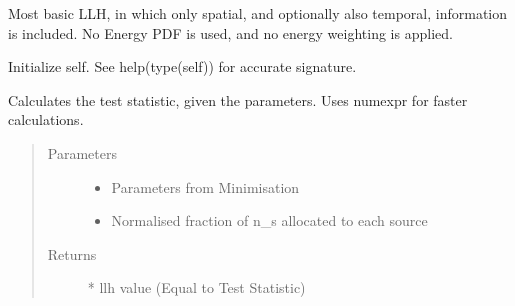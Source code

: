 \documentclass[letterpaper,10pt,english]{sphinxmanual}
\begin{document}
\begin{fulllineitems}
\label{\detokenize{index:flarestack.core.llh.SpatialLLH}}
Most basic LLH, in which only spatial, and optionally also temporal,
information is included. No Energy PDF is used, and no energy weighting
is applied.

\begin{fulllineitems}
\label{\detokenize{index:flarestack.core.llh.SpatialLLH.__init__}}
Initialize self.  See help(type(self)) for accurate signature.

\end{fulllineitems}


\begin{fulllineitems}
\label{\detokenize{index:flarestack.core.llh.SpatialLLH.calculate_test_statistic}}
Calculates the test statistic, given the parameters. Uses numexpr
for faster calculations.
\begin{quote}\begin{description}
\item[{Parameters}] \leavevmode\begin{itemize}
\item {} 
 \textendash{} Parameters from Minimisation

\item {} 
 \textendash{} Normalised fraction of n\_s allocated to each source

\end{itemize}

\item[{Returns}]  * llh value (Equal to Test Statistic)

\end{description}\end{quote}


\end{fulllineitems}
\end{fulllineitems}
\end{document}
